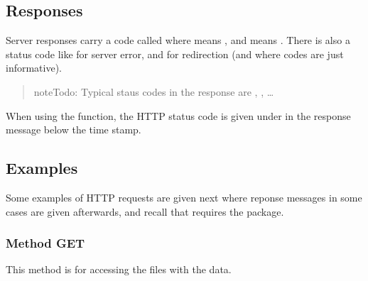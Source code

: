 \documentclass[a4paper,12pt,english]{sphinxhowto}
\begin{document}
\subsection{Responses}
\label{\detokenize{Sciencedata_dk:responses}}
Server responses carry a code called  where  means ,
and  means . There is also a status code like  for server
error, and  for redirection (and where codes  are just informative).
\begin{quote}

\begin{sphinxadmonition}{note}{\label{\detokenize{Sciencedata_dk:id5}}Todo:}
Typical staus codes in the response are , , …
\end{sphinxadmonition}
\end{quote}

When using the  function, the HTTP status code is given under  in the
response message below the time stamp.



\subsection{Examples}
\label{\detokenize{Sciencedata_dk:examples}}
Some examples of HTTP requests are given next where reponse messages in some cases are given
afterwards, and recall that  requires the  package.

\begin{sphinxVerbatim}[commandchars=\\\{\},formatcom=\footnotesize]
   
\end{sphinxVerbatim}



\subsubsection{Method GET}
\label{\detokenize{Sciencedata_dk:method-get}}
This method is for accessing the files with the data.
\end{document}
